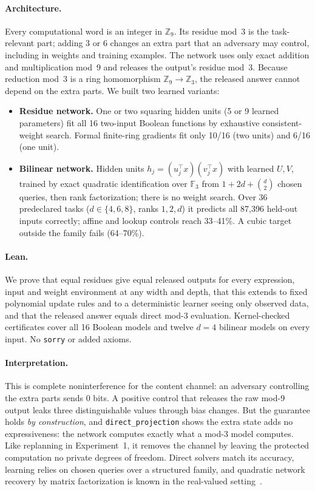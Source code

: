 \documentclass[11pt]{article}
\begin{document}
\paragraph{Architecture.} Every computational word is an integer in
$\mathbb{Z}_9$. Its residue mod~3 is the task-relevant part; adding 3 or 6
changes an extra part that an adversary may control, including in weights and
training examples. The network uses only exact addition and multiplication
mod~9 and releases the output's residue mod~3. Because reduction mod~3 is a
ring homomorphism $\mathbb{Z}_9\to\mathbb{Z}_3$, the released answer cannot
depend on the extra parts. We built two learned variants:
\begin{itemize}
\item \textbf{Residue network.} One or two squaring hidden units (5 or 9
  learned parameters) fit all 16 two-input Boolean functions by exhaustive
  consistent-weight search. Formal finite-ring gradients fit only 10/16 (two
  units) and 6/16 (one unit).
\item \textbf{Bilinear network.} Hidden units $h_j=(u_j^\top x)(v_j^\top x)$
  with learned $U,V$, trained by exact quadratic identification over
  $\mathbb{F}_3$ from $1+2d+\binom{d}{2}$ chosen queries, then rank
  factorization; there is no weight search. Over 36 predeclared tasks
  ($d\in\{4,6,8\}$, ranks $1,2,d$) it predicts all 87{,}396 held-out inputs
  correctly; affine and lookup controls reach 33--41\%. A cubic target outside
  the family fails (64--70\%).
\end{itemize}

\paragraph{Lean.} We prove that equal residues give equal released outputs for
every expression, input and weight environment at any width and depth, that
this extends to fixed polynomial update rules and to a deterministic learner
seeing only observed data, and that the released answer equals direct mod-3
evaluation. Kernel-checked certificates cover all 16 Boolean models and twelve
$d=4$ bilinear models on every input. No \texttt{sorry} or added axioms.

\paragraph{Interpretation.} This is complete noninterference for the content
channel: an adversary controlling the extra parts sends 0 bits. A positive
control that releases the raw mod-9 output leaks three distinguishable values
through bias changes. But the guarantee holds \emph{by construction}, and
\texttt{direct\_projection} shows the extra state adds no expressiveness: the
network computes exactly what a mod-3 model computes. Like replanning in
Experiment~1, it removes the channel by leaving the protected computation no
private degrees of freedom. Direct solvers match its accuracy, learning relies
on chosen queries over a structured family, and quadratic network recovery by
matrix factorization is known in the real-valued setting~\citep{soltani2018quadratic}.
\end{document}
